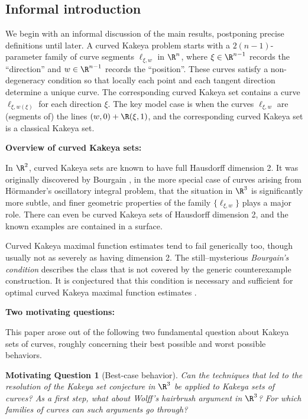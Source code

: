 \documentclass{article}
\numberwithin{equation}{section}
\theoremstyle{plain}
\newtheorem{motivatingquestion}[theorem]{Motivating Question}
\begin{document}
\subsection{Informal introduction}

We begin with an informal discussion of the main results, postponing precise definitions until later. A curved Kakeya problem starts with a $2(n-1)$-parameter family of curve segments $\ell_{\xi,w}$ in $\R^n$, where $\xi\in \R^{n-1}$ records the ``direction'' and $w \in \R^{n-1}$ records the ``position''. These curves satisfy a non-degeneracy condition so that locally each point and each tangent direction determine a unique curve. The corresponding curved Kakeya set contains a curve $\ell_{\xi,w(\xi)}$ for each direction $\xi$. The key model case is when the curves $\ell_{\xi,w}$ are (segments of) the lines $(w,0) + \R(\xi,1)$, and the corresponding curved Kakeya set is a classical Kakeya set. 

\medskip

\noindent \textbf{Overview of curved Kakeya sets:}

In $\R^2$, curved Kakeya sets are known to have full Hausdorff dimension 2. It was originally discovered by Bourgain \cite{Bou91}, in the more special case of curves arising from H\"ormander's oscillatory integral problem, that the situation in $\R^3$ is significantly more subtle, and finer geometric properties of the family $\{\ell_{\xi,w}\}$ plays a major role. There can even be curved Kakeya sets of Hausdorff dimension 2, and the known examples are contained in a surface. 

Curved Kakeya maximal function estimates tend to fail generically too, though usually not as severely as having dimension 2. The still--mysterious \emph{Bourgain's condition} describes the class that is not covered by the generic counterexample construction. It is conjectured that this condition is necessary and sufficient for optimal curved Kakeya maximal function estimates \cite{nadjimzadah2026bourgainsconditionstickykakeya, GWZ24}.

\medskip

\noindent \textbf{Two motivating questions:}

This paper arose out of the following two fundamental question about Kakeya sets of curves, roughly concerning their best possible and worst possible behaviors. 
\begin{motivatingquestion}[Best-case behavior]\label{question: best case}
    Can the techniques that led to the resolution of the Kakeya set conjecture in $\R^3$ be applied to Kakeya sets of curves? As a first step, what about Wolff's hairbrush argument in $\R^3$? For which families of curves can such arguments go through? 
\end{motivatingquestion}
\end{document}
